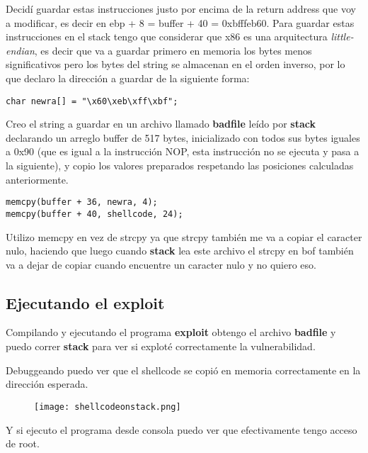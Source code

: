 \documentclass[11pt]{article}
\begin{document}
Decidí guardar estas instrucciones justo por encima de la return address que voy a modificar,
es decir en ebp + 8 = buffer + 40 = 0xbfffeb60. Para guardar estas instrucciones
en el stack tengo que considerar que x86 es una arquitectura \emph{little-endian},
es decir que va a guardar primero en memoria los bytes menos significativos pero los bytes
del string se almacenan en el orden inverso, por lo que declaro la dirección a guardar
de la siguiente forma:

\begin{verbatim}
char newra[] = "\x60\xeb\xff\xbf";
\end{verbatim}

Creo el string a guardar en un archivo llamado \textbf{badfile} leído por \textbf{stack}
declarando un arreglo buffer de 517 bytes, inicializado con todos sus bytes iguales
a 0x90 (que es igual a la instrucción NOP, esta instrucción no se ejecuta y pasa a la siguiente),
y copio los valores preparados respetando las posiciones calculadas anteriormente.
\begin{verbatim}
memcpy(buffer + 36, newra, 4);
memcpy(buffer + 40, shellcode, 24);
\end{verbatim}

Utilizo memcpy en vez de strcpy ya que strcpy también me va a copiar el caracter nulo,
haciendo que luego cuando \textbf{stack} lea este archivo el strcpy en bof también
va a dejar de copiar cuando encuentre un caracter nulo y no quiero eso.

\subsection*{Ejecutando el exploit}

Compilando y ejecutando el programa \textbf{exploit} obtengo el archivo \textbf{badfile}
y puedo correr \textbf{stack} para ver si exploté correctamente la vulnerabilidad.

Debuggeando puedo ver que el shellcode se copió en memoria correctamente en la 
dirección esperada.

\begin{figure}[h!]
    \begin{center}
        \texttt{[image: shellcodeonstack.png]}
    \end{center}
\end{figure}

Y si ejecuto el programa desde consola puedo ver que efectivamente tengo acceso
de root.
\end{document}
